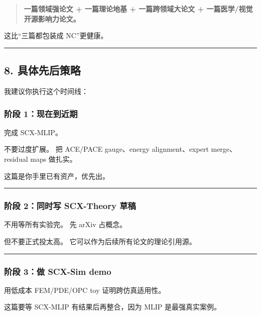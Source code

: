\documentclass[
  12pt,
]{ctexart}
\begin{document}
\begin{quote}
\textbf{一篇领域强论文 + 一篇理论地基 + 一篇跨领域大论文 +
一篇医学/视觉开源影响力论文。}
\end{quote}

这比``三篇都包装成 NC''更健康。

\begin{center}\rule{0.5\linewidth}{0.5pt}\end{center}

\subsection{8. 具体先后策略}\label{ux5177ux4f53ux5148ux540eux7b56ux7565}

我建议你执行这个时间线：

\subsubsection{阶段
1：现在到近期}\label{ux9636ux6bb5-1ux73b0ux5728ux5230ux8fd1ux671f}

完成 SCX-MLIP。

不要过度扩展。 把 ACE/PACE gauge、energy alignment、expert
merge、residual maps 做扎实。

这篇是你手里已有资产，优先出。

\begin{center}\rule{0.5\linewidth}{0.5pt}\end{center}

\subsubsection{阶段 2：同时写 SCX-Theory
草稿}\label{ux9636ux6bb5-2ux540cux65f6ux5199-scx-theory-ux8349ux7a3f}

不用等所有实验完。 先 arXiv 占概念。

但不要正式投太高。 它可以作为后续所有论文的理论引用源。

\begin{center}\rule{0.5\linewidth}{0.5pt}\end{center}

\subsubsection{阶段 3：做 SCX-Sim
demo}\label{ux9636ux6bb5-3ux505a-scx-sim-demo}

用低成本 FEM/PDE/OPC toy 证明跨仿真适用性。

这篇要等 SCX-MLIP 有结果后再整合，因为 MLIP 是最强真实案例。
\end{document}

